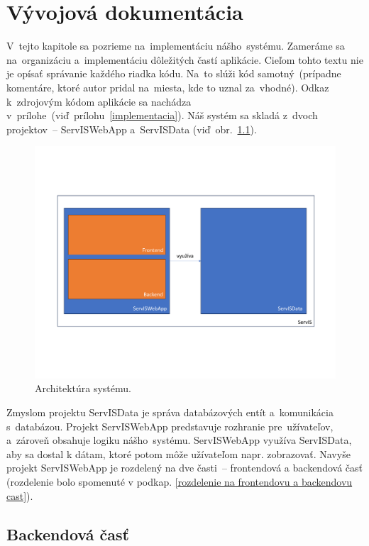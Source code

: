 \chapter{Vývojová dokumentácia}

V~tejto kapitole sa pozrieme na~implementáciu nášho~systému. Zameráme sa na~organizáciu a~implementáciu dôležitých častí aplikácie. Cieľom tohto textu nie je opísať správanie každého riadka kódu. Na~to slúži kód samotný~(prípadne komentáre, ktoré autor pridal na~miesta, kde to uznal za~vhodné). Odkaz k~zdrojovým kódom aplikácie sa nachádza v~prílohe~(viď~prílohu~\ref{implementacia}). Náš systém sa skladá z~dvoch projektov~-- ServISWebApp a~ServISData (viď~obr.~\ref{architektura systemu}).

\begin{figure}[H]\centering
\includegraphics[width=140mm]{../img/architektura systemu}
\caption{Architektúra systému.}
\label{architektura systemu}
\end{figure}

Zmyslom projektu ServISData je správa databázových entít a~komunikácia s~databázou. Projekt ServISWebApp predstavuje rozhranie pre~užívateľov, a~zároveň obsahuje logiku nášho~systému. ServISWebApp využíva ServISData, aby sa dostal k dátam, ktoré potom môže užívateľom napr. zobrazovať. Navyše projekt ServISWebApp je rozdelený na dve časti~-- frontendová a backendová časť (rozdelenie bolo spomenuté v podkap. \ref{rozdelenie na frontendovu a backendovu cast}).

\section{Backendová časť}

